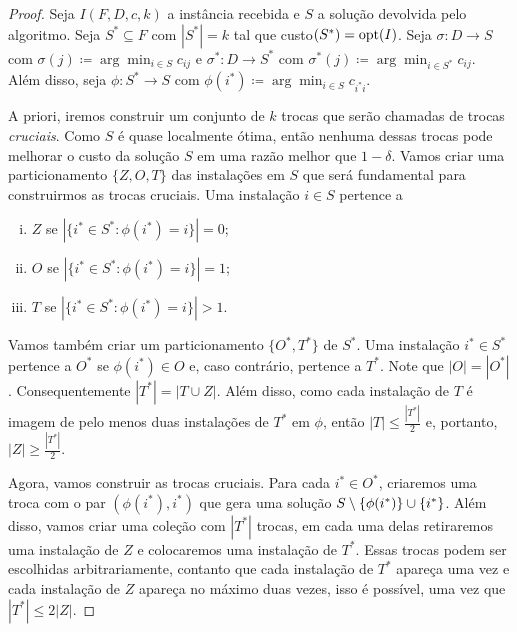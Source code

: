 \begin{proof}
Seja $I(F,D,c,k)$ a instância recebida e $S$ a solução devolvida pelo algoritmo. Seja $S^* \subseteq F$ com $|S^*| = k$ tal que custo$(S^*) = \mathrm{opt}(I)$. Seja $\sigma : D \rightarrow S$ com $\sigma(j) \coloneqq \arg\min_{i \in S} c_{ij}$ e $\sigma^* : D \rightarrow S^*$ com $\sigma^*(j) \coloneqq \arg\min_{i\in S^*} c_{ij}$. Além disso, seja $\phi:S^* \rightarrow S$ com $\phi(i^*) \coloneqq \arg\min_{i \in S} c_{i^*i}$.

A priori, iremos construir um conjunto de $k$ trocas que serão chamadas de trocas \emph{cruciais}. Como $S$ é quase localmente ótima, então nenhuma dessas trocas pode melhorar o custo da solução $S$ em uma razão melhor que $ 1- \delta$. Vamos criar uma particionamento $\{Z,O,T\}$ das instalações em $S$ que será fundamental para construirmos as trocas cruciais. Uma instalação $i \in S$ pertence a 
\begin{enumerate}[i.]
\item $Z$ se $|\{i^* \in S^* : \phi(i^*) = i\}| = 0$;
\item $O$ se $|\{i^* \in S^* : \phi(i^*) = i\}| = 1$;
\item $T$ se $|\{i^* \in S^* : \phi(i^*) = i\}| > 1$.
\end{enumerate}
Vamos também criar um particionamento $\{O^*,T^*\}$ de $S^*$. Uma instalação $i^* \in S^*$ pertence a $O^*$ se $\phi(i^*) \in O$ e, caso contrário, pertence a $T^*$. Note que $|O| = |O^*|$. Consequentemente $|T^*| = |T\cup Z|$. Além disso, como cada instalação de $T$ é imagem de pelo menos duas instalações de $T^*$ em $\phi$, então $|T| \leq \frac{|T^*|}{2}$ e, portanto, $|Z| \geq \frac{|T^*|}{2}$.

Agora, vamos construir as trocas cruciais. Para cada $i^* \in O^*$, criaremos uma troca com o par $(\phi(i^*),i^*)$ que gera uma solução $S\setminus \{\phi(i^*)\} \cup \{i^*\}$. Além disso, vamos criar uma coleção com $|T^*|$ trocas, em cada uma delas retiraremos uma instalação de $Z$ e colocaremos uma instalação de $T^*$. Essas trocas podem ser escolhidas arbitrariamente, contanto que cada instalação de $T^*$ apareça uma vez e cada instalação de $Z$ apareça no máximo duas vezes, isso é possível, uma vez que $|T^*| \leq 2 |Z|$.


\end{proof}
